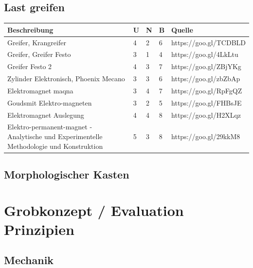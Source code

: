 \documentclass[a4paper]{report}
\begin{document}
\section{Last greifen}
\begin{tabular}{|p{}|p{}|p{}|p{}|p{}|}
	\hline
	\textbf{Beschreibung} & \textbf{U} & \textbf{N} & \textbf{B} & \textbf{Quelle} \\
	\hline
	Greifer, Krangreifer &4 &2 &6 & https://goo.gl/TCDBLD \\
	\hline
	Greifer, Greifer Festo &3 &1 &4 & https://goo.gl/4LkLtu\\
	\hline
	Greifer Festo 2 &4 &3 &7 & https://goo.gl/ZBjYKg\\
	\hline
	Zylinder Elektronisch, Phoenix Mecano &3 &3 &6 & https://goo.gl/zbZbAp\\
	\hline
	Elektromagnet maqna &3 &4 &7 & https://goo.gl/RpFgQZ\\
	\hline
	Goudsmit Elektro-magneten &3 &2 &5 & https://goo.gl/FHBsJE\\
	\hline
	Elektromagnet Auslegung &4 &4 &8 & https://goo.gl/H2XLqz\\
	\hline
	Elektro-permanent-magnet - Analytische und Experimentelle Methodologie und Konstruktion & 5 & 3 & 8 & https://goo.gl/29kkM8\\
  \hline
\end{tabular}

\section{Morphologischer Kasten}



\chapter{Grobkonzept / Evaluation Prinzipien}

\section{Mechanik}
\end{document}
